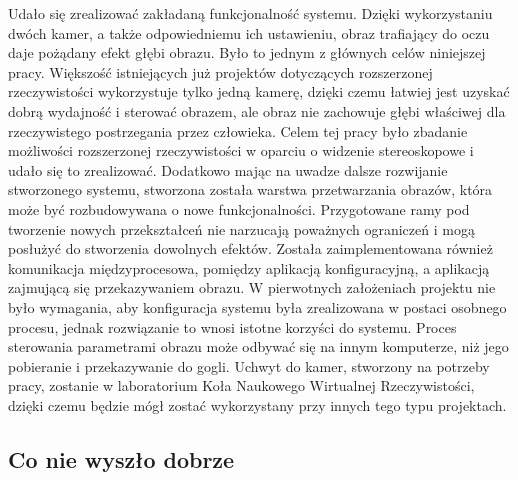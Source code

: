 \documentclass[a4paper,11pt,twoside]{report}
\theoremstyle{definition}
\begin{document}
Udało się zrealizować zakładaną funkcjonalność systemu. Dzięki wykorzystaniu dwóch kamer, a także odpowiedniemu ich ustawieniu, obraz trafiający do oczu daje pożądany efekt głębi obrazu. Było to jednym z głównych celów niniejszej pracy. Większość istniejących już projektów dotyczących rozszerzonej rzeczywistości wykorzystuje tylko jedną kamerę, dzięki czemu łatwiej jest uzyskać dobrą wydajność i sterować obrazem, ale obraz nie zachowuje głębi właściwej dla rzeczywistego postrzegania przez człowieka. Celem tej pracy było zbadanie możliwości rozszerzonej rzeczywistości w oparciu o widzenie stereoskopowe i udało się to zrealizować. Dodatkowo mając na uwadze dalsze rozwijanie stworzonego systemu, stworzona została warstwa przetwarzania obrazów, która może być rozbudowywana o nowe funkcjonalności. Przygotowane ramy pod tworzenie nowych przekształceń nie narzucają poważnych ograniczeń i mogą posłużyć do stworzenia dowolnych efektów. Została zaimplementowana również komunikacja międzyprocesowa, pomiędzy aplikacją konfiguracyjną, a aplikacją zajmującą się przekazywaniem obrazu. W pierwotnych założeniach projektu nie było wymagania, aby konfiguracja systemu była zrealizowana w postaci osobnego procesu, jednak rozwiązanie to wnosi istotne korzyści do systemu. Proces sterowania parametrami obrazu może odbywać się na innym komputerze, niż jego pobieranie i przekazywanie do gogli.
Uchwyt do kamer, stworzony na potrzeby pracy, zostanie w laboratorium Koła Naukowego Wirtualnej Rzeczywistości, dzięki czemu będzie mógł zostać wykorzystany przy innych tego typu projektach.

\subsection{Co nie wyszło dobrze}
\end{document}
